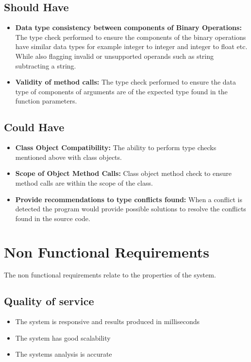 \documentclass{l4proj}
\begin{document}
\subsection{Should Have}
\begin{itemize}
    \item \textbf{Data type consistency between components of Binary Operations:} The type check performed to ensure the components of the binary operations have similar data types for example integer to integer and integer to float etc. While also flagging invalid or unsupported operands such as string subtracting a string.
    \item \textbf{Validity of method calls:} The type check performed to ensure the data type of components of arguments are of the expected type found in the function parameters.
\end{itemize}

\subsection{Could Have}
\begin{itemize}
    \item \textbf{Class Object Compatibility:} The ability to perform type checks mentioned above with class objects.
    \item \textbf{Scope of Object Method Calls:} Class object method check to ensure method calls are within the scope of the class.
    \item \textbf{Provide recommendations to type conflicts found:} When a conflict is detected the program would provide possible solutions to resolve the conflicts found in the source code.
\end{itemize}

\section{Non Functional Requirements}
The non functional requirements relate to the properties of the system.

\subsection{Quality of service}
\begin{itemize}
    \item The system is responsive and results produced in milliseconds 
    \item The system has good scalability 
    \item The systems analysis is accurate
\end{itemize}
\end{document}
